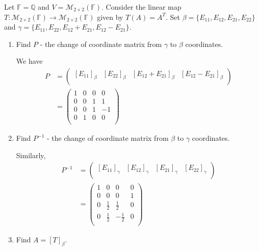 \documentclass{eh-homework}
\begin{document}
    \begin{question}{4}
        Let \( \mathbb{F} = \mathbb{Q} \) and \( V = \mathcal{M}_{2 \times 2}(\mathbb{F}) \). Consider the linear map \( T : \mathcal{M}_{2 \times 2}(\mathbb{F}) \to \mathcal{M}_{2 \times 2}(\mathbb{F}) \) given by \( T(A) = A^T \). Set \( \beta = \{ E_{11}, E_{12}, E_{21}, E_{22} \} \) and \( \gamma = \{ E_{11}, E_{22}, E_{12} + E_{21}, E_{12} - E_{21} \} \).

        \begin{enumerate}[label=(\alph*)]
            \item Find \( P \) - the change of coordinate matrix from \( \gamma \) to \( \beta \) coordinates.
            
            We have
            \begin{align*}
                P &= \begin{pmatrix}
                    [E_{11}]_\beta & [E_{22}]_\beta & [E_{12} + E_{21}]_\beta &  [E_{12} - E_{21}]_\beta \\
                \end{pmatrix} \\
                &= \begin{pmatrix}
                    1 & 0 & 0 & 0  \\
                    0 & 0 & 1 & 1  \\
                    0 & 0 & 1 & -1  \\
                    0 & 1 & 0 &  0 \\
                \end{pmatrix}
            \end{align*}
            \item Find \( P^{-1} \) - the change of coordinate matrix from \( \beta \) to \( \gamma \) coordinates.
            
            Similarly,
            \begin{align*}
                P^{-1} &= \begin{pmatrix}
                    [E_{11}]_\gamma & [E_{12}]_\gamma & [E_{21}]_\gamma & [E_{22}]_\gamma \\
                \end{pmatrix} \\
                &= \begin{pmatrix}
                    1 & 0 & 0 & 0  \\
                    0 & 0 & 0 & 1  \\
                    0 & \frac{1}{2} & \frac{1}{2} & 0  \\
                    0 & \frac{1}{2} & -\frac{1}{2} & 0  \\
                \end{pmatrix}
            \end{align*}
            \item Find \( A = [T]_\beta \).
            

\end{enumerate}
\end{question}
\end{document}
